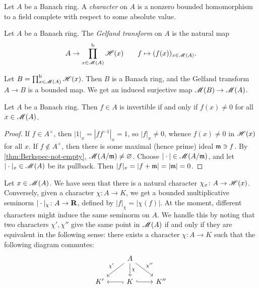 \begin{definition}
Let $A$ be a Banach ring. A \emph{character} on $A$ is a nonzero bounded 
homomorphism to a field complete with respect to some absolute value. 
\end{definition}

\begin{definition}
Let $A$ be a Banach ring. The \emph{Gelfand transform} on $A$ is the natural 
map 
\[
  A\to \prod^\mathrm{b}_{x\in \operatorname{\mathscr{M}}(A)}  \mathscr{H}(x) \qquad f\mapsto (f(x))_{x\in \operatorname{\mathscr{M}}(A)} .
\]
\end{definition}

Let $B=\prod_{x\in \operatorname{\mathscr{M}}(A)}^\mathrm{b} \mathscr{H}(x)$. Then $B$ is a Banach ring, 
and the Gelfand transform $A\to B$ is a bounded map. We get an induced 
surjective map $\operatorname{\mathscr{M}}(B)\to \operatorname{\mathscr{M}}(A)$. 

\begin{lemma}
Let $A$ be a Banach ring. Then $f\in A$ is invertible if and only if 
$f(x)\ne 0$ for all $x\in \operatorname{\mathscr{M}}(A)$. 
\end{lemma}
\begin{proof}
If $f\in A^\times$, then $|1|_x = |f f^{-1}|_x = 1$, so $|f|_x\ne 0$, whence 
$f(x)\ne 0$ in $\mathscr{H}(x)$ for all $x$. If $f\notin A^\times$, then there is some 
maximal (hence prime) ideal $\mathfrak{m}\ni f$. By \autoref{thm:Berkspec-not-empty}, 
$\operatorname{\mathscr{M}}(A/\mathfrak{m})\ne\varnothing$. Choose $|\cdot|\in \operatorname{\mathscr{M}}(A/\mathfrak{m})$, and 
let $|\cdot|_x\in \operatorname{\mathscr{M}}(A)$ be its pullback. Then 
$|f|_x = |f+\mathfrak{m}| = |\mathfrak{m}| = 0$. 
\end{proof}

Let $x\in \operatorname{\mathscr{M}}(A)$. We have seen that there is a natural character 
$\chi_x\colon A\to \mathscr{H}(x)$. Conversely, given a character $\chi\colon A\to K$, 
we get a bounded multiplicative seminorm $|\cdot|_\chi\colon A\to \mathbf{R}$, defined 
by $|f|_\chi = |\chi(f)|$. At the moment, different characters might induce the 
same seminorm on $A$. We handle this by noting that two characters 
$\chi',\chi''$ give the same point in $\operatorname{\mathscr{M}}(A)$ if and only if they are 
equivalent in the following sense: there exists a character $\chi\colon A\to K$ 
such that the following diagram commutes:
\begin{equation}\label{eq:equiv-characters}
\begin{tikzcd}
  & A \ar[dl, swap, "\chi'"] \ar[d, "\chi"] \ar[dr, "\chi''"] \\
  K' 
    & K \ar[l, hook] \ar[r, hook]
    & K''
\end{tikzcd}
\end{equation}



